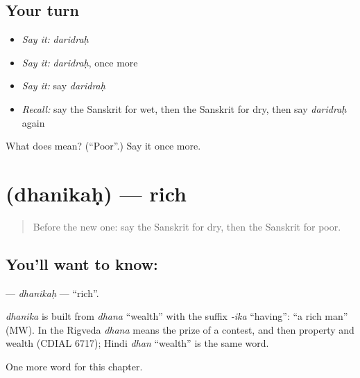 \subsection*{Your turn}
\begin{itemize}
\raggedright
  \item \emph{Say it:} \emph{daridraḥ}
  \item \emph{Say it:} \emph{daridraḥ}, once more
  \item \emph{Say it:} say \emph{daridraḥ}
  \item \emph{Recall:} say the Sanskrit for wet, then the Sanskrit for dry, then say \emph{daridraḥ} again
\end{itemize}

\begin{tcolorbox}[breakable,colback=teal!4,colframe=teal!35!black,title={Before you move on}]
What does  mean? (\textquotedblleft{}Poor\textquotedblright{}.) Say it once more.
\end{tcolorbox}
\section[\texorpdfstring{\sk{धनिकः} (dhanikaḥ)}{धनिकः (dhanikaḥ)}]{ (dhanikaḥ) — rich}

\label{lesson:SA-C127-dhanikah}



\begin{quote}
Before the new one: say the Sanskrit for dry, then the Sanskrit for poor.
\end{quote}

\subsection*{You'll want to know: }
\textbf{} — \emph{dhanikaḥ} — \textquotedblleft{}rich\textquotedblright{}.

\begin{cousinweb}
\emph{dhanika} is built from \emph{dhana} \textquotedblleft{}wealth\textquotedblright{} with the suffix \emph{-ika} \textquotedblleft{}having\textquotedblright{}: \textquotedblleft{}a rich man\textquotedblright{} (MW). In the Rigveda \emph{dhana} means the prize of a contest, and then property and wealth (CDIAL 6717); Hindi \emph{dhan} \textquotedblleft{}wealth\textquotedblright{} is the same word.
\end{cousinweb}

\begin{grammarlens}[title={What you've built}]
One more word for this chapter.
\end{grammarlens}

